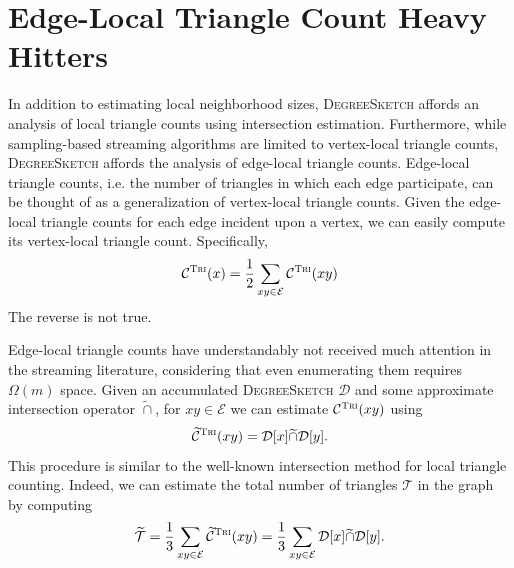 \documentclass[10]{report}
\newcommand{\algoname}[1]{\textnormal{\textsc{#1}}}
\begin{document}
\section{Edge-Local Triangle Count Heavy Hitters}
 \label{DS:sec:edge_triangles}

In addition to estimating local neighborhood sizes, \algoname{DegreeSketch} affords an analysis of local triangle counts using intersection estimation. 
Furthermore, while sampling-based streaming algorithms are limited to vertex-local triangle counts, \algoname{DegreeSketch} affords the analysis of edge-local triangle counts. 
Edge-local triangle counts, i.e. the number of triangles in which each edge participate, can be thought of as a generalization of vertex-local triangle counts. 
Given the edge-local triangle counts for each edge incident upon a vertex, we can easily compute its vertex-local triangle count.
Specifically,
%
\begin{equation} \label{eq:sum_of_edge_tris}
	\mathcal{C}^\algoname{Tri}(x) 
	= \frac{1}{2}\sum\limits_{xy \in \mathcal{E}} \mathcal{C}^\algoname{Tri}(xy)
\end{equation}
%
The reverse is not true. 

Edge-local triangle counts have understandably not received much attention in the streaming literature, considering that even enumerating them requires $\Omega(m)$ space. 
Given an accumulated \algoname{DegreeSketch} $\mathcal{D}$ and some approximate intersection operator $\widetilde{\cap}$, for $xy \in \mathcal{E}$ we can estimate $\mathcal{C}^{\algoname{Tri}}(xy)$ using 
%
\begin{equation} \label{eq:tri:edge}
	\widetilde{\mathcal{C}}^{\algoname{Tri}}(xy) 
	= \mathcal{D}[x] \widetilde{\cap} \mathcal{D}[y].
\end{equation}
%
This procedure is similar to the well-known intersection method for local triangle counting. 
Indeed, we can estimate the total number of triangles $\mathcal{T}$ in the graph by computing
%
\begin{equation} \label{eq:tri:total}
	\widetilde{\mathcal{T}} 
	= \frac{1}{3} \sum\limits_{xy \in \mathcal{E}} 	\widetilde{\mathcal{C}}^{\algoname{Tri}}(xy) 
	= \frac{1}{3} \sum\limits_{xy \in \mathcal{E}} \mathcal{D}[x] \widetilde{\cap} \mathcal{D}[y].
\end{equation}
%
\end{document}
